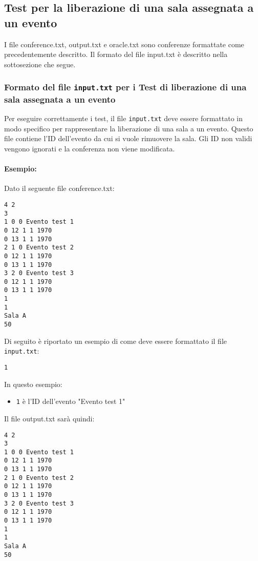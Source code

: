 \documentclass[11pt]{scrartcl} %
\begin{document}
\subsection{Test per la liberazione di una sala assegnata a un evento}

I file conference.txt, output.txt e oracle.txt sono conferenze formattate come precedentemente descritto. Il formato del file input.txt è descritto nella sottosezione che segue.

\subsubsection{Formato del file \texttt{input.txt} per i Test di  liberazione di una sala assegnata a un evento}

Per eseguire correttamente i test, il file \texttt{input.txt} deve essere formattato in modo specifico per rappresentare la liberazione di una sala a un evento. Questo file contiene l'ID dell'evento da cui si vuole rimuovere la sala.
Gli ID non validi vengono ignorati e la conferenza non viene modificata.


\paragraph{Esempio:}
Dato il seguente file conference.txt:
\begin{lstlisting}
4 2
3
1 0 0 Evento test 1
0 12 1 1 1970
0 13 1 1 1970
2 1 0 Evento test 2
0 12 1 1 1970
0 13 1 1 1970
3 2 0 Evento test 3
0 12 1 1 1970
0 13 1 1 1970
1
1
Sala A
50
\end{lstlisting}

Di seguito è riportato un esempio di come deve essere formattato il file \texttt{input.txt}:

\begin{lstlisting}
1
\end{lstlisting}

In questo esempio:
\begin{itemize}
    \item \texttt{1} è l'ID dell'evento "Evento test 1"
\end{itemize}
Il file output.txt sarà quindi:

\begin{lstlisting}
4 2
3
1 0 0 Evento test 1
0 12 1 1 1970
0 13 1 1 1970
2 1 0 Evento test 2
0 12 1 1 1970
0 13 1 1 1970
3 2 0 Evento test 3
0 12 1 1 1970
0 13 1 1 1970
1
1
Sala A
50
\end{lstlisting}
\end{document}
